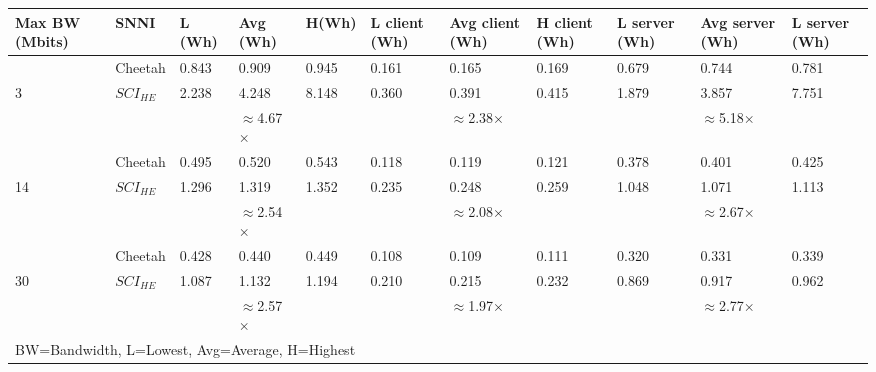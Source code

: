 \begin{tabular}{lllllllllll}
Max BW (Mbits) & SNNI    & L (Wh) & Avg (Wh) & H(Wh) & L client (Wh) & Avg client (Wh) & H client (Wh) & L server (Wh) & Avg server (Wh) & L server (Wh) \\ \hline
               & Cheetah & 0.843  & 0.909    & 0.945 & 0.161         & 0.165           & 0.169         & 0.679         & 0.744           & 0.781         \\
3              & $SCI_{HE}$  & 2.238  & 4.248    & 8.148 & 0.360         & 0.391           & 0.415         & 1.879         & 3.857           & 7.751         \\ \cline{3-11} 
               &         &        & $\approx$4.67$\times$    &       &               & $\approx$2.38$\times$           &               &               & $\approx$5.18$\times$           &               \\ \hline
               & Cheetah & 0.495  & 0.520    & 0.543 & 0.118         & 0.119           & 0.121         & 0.378         & 0.401           & 0.425         \\
14             & $SCI_{HE}$  & 1.296  & 1.319    & 1.352 & 0.235         & 0.248           & 0.259         & 1.048         & 1.071           & 1.113         \\ \cline{3-11} 
               &         &        & $\approx$2.54$\times$    &       &               & $\approx$2.08$\times$           &               &               & $\approx$2.67$\times$          &               \\ \hline
               & Cheetah & 0.428  & 0.440    & 0.449 & 0.108         & 0.109           & 0.111         & 0.320         & 0.331           & 0.339         \\
30             & $SCI_{HE}$  & 1.087  & 1.132    & 1.194 & 0.210         & 0.215           & 0.232         & 0.869         & 0.917           & 0.962         \\ \cline{3-11} 
               &         &        & $\approx$2.57$\times$    &       &               & $\approx$1.97$\times$           &               &               & $\approx$2.77$\times$           &               \\ \hline
\multicolumn{11}{l}{BW=Bandwidth, L=Lowest, Avg=Average, H=Highest} 
\end{tabular}
